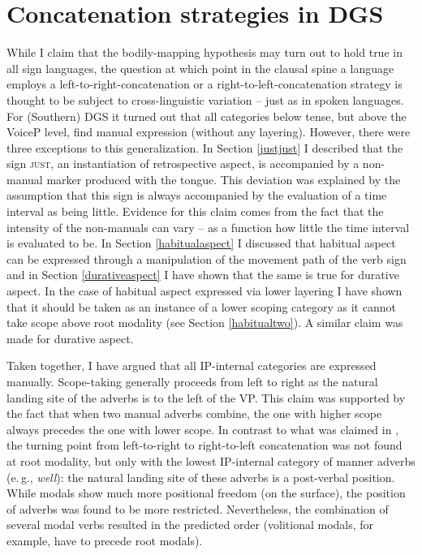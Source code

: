 

\section{Concatenation strategies in DGS}\label{concatenatiostrategies}
While I claim that the bodily-mapping hypothesis may turn out to hold true in all sign languages, the question at which point in the clausal spine a language employs a left-to-right-concatenation or a right-to-left-concatenation strategy is thought to be subject to cross-linguistic variation -- just as in spoken languages. For (Southern) DGS it turned out that all categories below tense, but above the VoiceP level, find manual expression (without any layering). However, there were three exceptions to this generalization. In Section \ref{justjust} I described that the sign \textsc{just}, an instantiation of retrospective aspect, is accompanied by a non-manual marker produced with the tongue. This deviation was explained by the assumption that this sign is always accompanied by the evaluation of a time interval as being little. Evidence for this claim comes from the fact that the intensity of the non-manuals can vary -- as a function how little the time interval is evaluated to be. In Section \ref{habitualaspect} I discussed that habitual aspect can be expressed through a manipulation of the movement path of the verb sign and in Section \ref{durativeaspect} I have shown that the same is true for durative aspect. In the case of habitual aspect expressed via lower layering I have shown that it should be taken as an instance of a lower scoping category as it cannot take scope above root modality (see Section \ref{habitualtwo}). A similar claim was made for durative aspect.

Taken together, I have argued that all IP-internal categories are expressed manually. Scope-taking generally proceeds from left to right as the natural landing site of the adverbs is to the left of the VP. This claim was supported by the fact that when two manual adverbs combine, the one with higher scope always precedes the one with lower scope. In contrast to what was claimed in \citet{bross2017scope}, the turning point from left-to-right to right-to-left concatenation was not found at root modality, but only with the lowest IP-internal category of manner adverbs (e.\,g., \textit{well}): the natural landing site of these adverbs is a post-verbal position. While modals show much more positional freedom (on the surface), the position of adverbs was found to be more restricted. Nevertheless, the combination of several modal verbs resulted in the predicted order (volitional modals, for example, have to precede root modals). 

